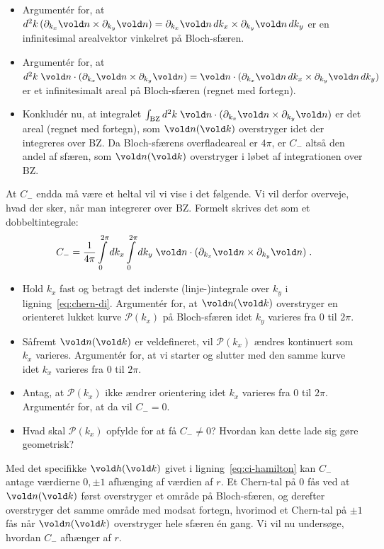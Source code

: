 \documentclass[11pt, a4paper]{article}
\let\v\vold
\newcommand{\v}[1]{{\bf{#1}}}
\begin{document}
\begin{itemize}
\item Argumentér for, at $d^2k \, (\partial_{k_x} \v n
  \times \partial_{k_y} \v n) = \partial_{k_x} \v n \, dk_x \times
  \partial_{k_y} \v n \, dk_y$ er en infinitesimal arealvektor vinkelret
  på Bloch-sfæren.
\item Argumentér for, at $d^2k \; \v n \cdot (\partial_{k_x} \v n
  \times \partial_{k_y} \v n) = \v n \cdot ( \partial_{k_x} \v n
    \, dk_x \times \partial_{k_y} \v n \, dk_y )$ er et
  infinitesimalt areal på Bloch-sfæren (regnet med fortegn).
\item Konkludér nu, at integralet $\int_\text{BZ} d^2k \; \v n \cdot
  (\partial_{k_x} \v n \times \partial_{k_y} \v n)$ er det areal
  (regnet med fortegn), som $\v n (\v k)$ overstryger idet der
  integreres over BZ. Da Bloch-sfærens overfladeareal er $4\pi$, er
  $C_-$ altså den andel af sfæren, som $\v n (\v k)$ overstryger i
  løbet af integrationen over BZ.
\end{itemize}
At $C_-$ endda må være et heltal vil vi vise i det følgende. Vi vil
derfor overveje, hvad der sker, når man integrerer over BZ. Formelt
skrives det som et dobbeltintegrale:
\begin{equation}
  \label{eq:chern-di}
  C_- = \frac{1}{4\pi}
  \int\limits_0^{2\pi} dk_x \int\limits_0^{2\pi} dk_y \;
  \v n \cdot
  (\partial_{k_x} \v n \times \partial_{k_y} \v n) \; .
\end{equation}

\begin{itemize}
\item Hold $k_x$ fast og betragt det inderste (linje-)integrale over
  $k_y$ i ligning~\eqref{eq:chern-di}. Argumentér for, at $\v n(\v k)$
  overstryger en orienteret lukket kurve $\mathcal{P}(k_x)$ på
  Bloch-sfæren idet $k_y$ varieres fra $0$ til $2\pi$.
\item Såfremt $\v n(\v k)$ er veldefineret, vil $\mathcal{P}(k_x)$
  ændres kontinuert som $k_x$ varieres. Argumentér for, at vi starter
  og slutter med den samme kurve idet $k_x$ varieres fra $0$ til
  $2\pi$.
\item Antag, at $\mathcal{P}(k_x)$ ikke ændrer orientering idet $k_x$
  varieres fra $0$ til $2\pi$. Argumentér for, at da vil $C_- = 0$.
\item Hvad skal $\mathcal{P}(k_x)$ opfylde for at få $C_- \neq 0$?
  Hvordan kan dette lade sig gøre geometrisk?
\end{itemize}

Med det specifikke $\v h (\v k)$ givet i
ligning~\eqref{eq:ci-hamilton} kan $C_-$ antage værdierne $0, \pm 1$
afhænging af værdien af $r$. Et Chern-tal på $0$ fås ved at $\v n (\v
k)$ først overstryger et område på Bloch-sfæren, og derefter
overstryger det samme område med modsat fortegn, hvorimod et Chern-tal
på $\pm 1$ fås når $\v n(\v k)$ overstryger hele sfæren én gang. Vi
vil nu undersøge, hvordan $C_-$ afhænger af $r$.
\end{document}
